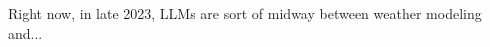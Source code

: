 \documentclass[handout]{beamer} %
\begin{document}
\begin{frame}[plain]
\end{frame}


\begin{frame}
	Right now, in late 2023, LLMs are sort of midway between weather modeling and...
\end{frame}
\end{document}
